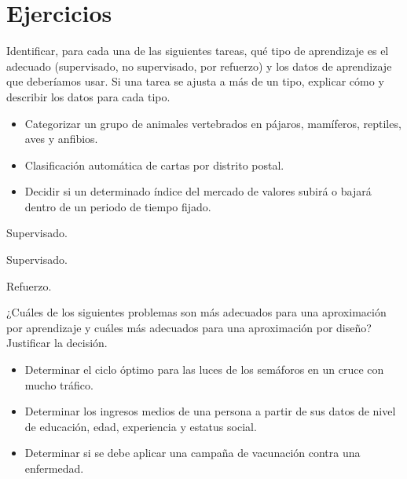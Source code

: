 \documentclass[a4paper, 11pt]{article}
\begin{document}
    \maketitle

    \section{Ejercicios}

    \begin{ejercicio}
        Identificar, para cada una de las siguientes tareas, qué tipo de aprendizaje es el adecuado (supervisado, no supervisado, por refuerzo) y los datos de aprendizaje que deberíamos usar. Si una tarea se ajusta a más de un tipo, explicar cómo y describir los datos para cada tipo.
        \begin{itemize}
            \item Categorizar un grupo de animales vertebrados en pájaros, mamíferos, reptiles, aves y anfibios.
            \item Clasificación automática de cartas por distrito postal.
            \item Decidir si un determinado índice del mercado de valores subirá o bajará dentro de un periodo de tiempo fijado.
        \end{itemize}
    \end{ejercicio}

    \begin{solucion}
        Supervisado.

        Supervisado.

        Refuerzo.
    \end{solucion}


    \begin{ejercicio}
        ¿Cuáles de los siguientes problemas son más adecuados para una aproximación por aprendizaje y cuáles más adecuados para una aproximación por diseño? Justificar la decisión.
        \begin{itemize}
            \item Determinar el ciclo óptimo para las luces de los semáforos en un cruce con mucho tráfico.
            \item Determinar los ingresos medios de una persona a partir de sus datos de nivel de educación, edad, experiencia y estatus social.
            \item Determinar si se debe aplicar una campaña de vacunación contra una enfermedad.
        \end{itemize}
    \end{ejercicio}
\end{document}

